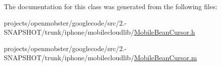 \-The documentation for this class was generated from the following files\-:\begin{DoxyCompactItemize}
\item 
projects/openmobster/googlecode/src/2.-\/\-S\-N\-A\-P\-S\-H\-O\-T/trunk/iphone/mobilecloudlib/\hyperlink{_mobile_bean_cursor_8h}{\-Mobile\-Bean\-Cursor.\-h}\item 
projects/openmobster/googlecode/src/2.-\/\-S\-N\-A\-P\-S\-H\-O\-T/trunk/iphone/mobilecloudlib/\hyperlink{_mobile_bean_cursor_8m}{\-Mobile\-Bean\-Cursor.\-m}\end{DoxyCompactItemize}

